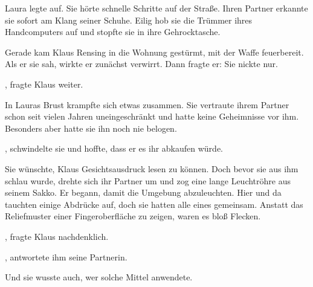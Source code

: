 \par

Laura legte auf. Sie hörte schnelle Schritte auf der Straße. Ihren Partner erkannte sie sofort am Klang seiner Schuhe. Eilig hob sie die Trümmer ihres Handcomputers auf und stopfte sie in ihre Gehrocktasche.

\par

Gerade kam Klaus Rensing in die Wohnung gestürmt, mit der Waffe feuerbereit. Als er sie sah, wirkte er zunächst verwirrt. Dann fragte er:  Sie nickte nur.

\par

, fragte Klaus weiter.

\par

In Lauras Brust krampfte sich etwas zusammen. Sie vertraute ihrem Partner schon seit vielen Jahren uneingeschränkt und hatte keine Geheimnisse vor ihm. Besonders aber hatte sie ihn noch nie belogen.

\par

, schwindelte sie und hoffte, dass er es ihr abkaufen würde. 

\par

Sie wünschte, Klaus Gesichtsausdruck lesen zu können. Doch bevor sie aus ihm schlau wurde, drehte sich ihr Partner um und zog eine lange Leuchtröhre aus seinem Sakko. Er begann, damit die Umgebung abzuleuchten. Hier und da tauchten einige Abdrücke auf, doch sie hatten alle eines gemeinsam. Anstatt das Reliefmuster einer Fingeroberfläche zu zeigen, waren es bloß Flecken.

\par

, fragte Klaus nachdenklich.

\par

, antwortete ihm seine Partnerin. 

\par

Und sie wusste auch, wer solche Mittel anwendete.